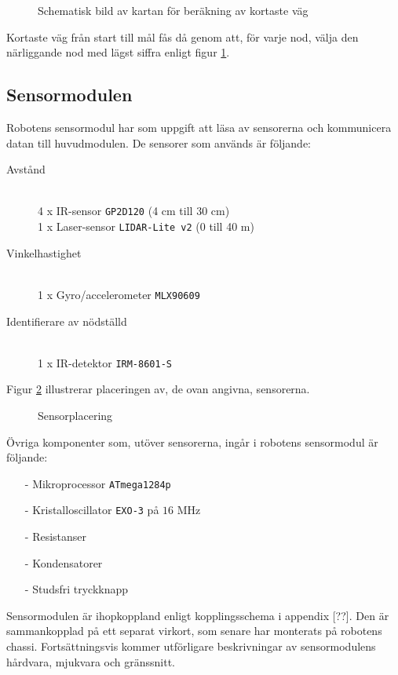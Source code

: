 \documentclass[11pt]{article}
\begin{document}
\begin{flushleft}
\begin{figure}[htbp]
\centering
\noindent\resizebox{0.7\linewidth}{!}{
	}
	\caption{Schematisk bild av kartan för beräkning av kortaste väg}	\label{path}
\end{figure}


Kortaste väg från start till mål fås då genom att, för varje nod, välja den närliggande nod med lägst siffra enligt figur \ref{path}.

\pagebreak

\subsection{Sensormodulen}
Robotens sensormodul har som uppgift att läsa av sensorerna och kommunicera datan till huvudmodulen. De sensorer som används är följande:
\begin{description}
	\item[Avstånd] \hfill \\
	4 x IR-sensor \verb+GP2D120+ (4 cm till 30 cm) \\
	1 x Laser-sensor \verb+LIDAR-Lite v2+ (0 till 40 m) \\
	\item[Vinkelhastighet] \hfill \\
	1 x Gyro/accelerometer \verb+MLX90609+ 
	\item[Identifierare av nödställd] \hfill \\
	1 x IR-detektor \verb+IRM-8601-S+
\end{description}
Figur \ref{sensors} illustrerar placeringen av, de ovan angivna, sensorerna. 

\begin{figure}[htbp]
\centering
\noindent\resizebox{.8\textwidth}{!}{
		}
	\caption{Sensorplacering \label{sensors}}
\end{figure}

Övriga komponenter som, utöver sensorerna, ingår i robotens sensormodul är följande:
\begin{itemize}
  \item[-] Mikroprocessor \verb+ATmega1284p+
  \item[-] Kristalloscillator \verb+EXO-3+ på $16$ MHz
  \item[-] Resistanser
  \item[-] Kondensatorer
  \item[-] Studsfri tryckknapp
\end{itemize}

Sensormodulen är ihopkoppland enligt kopplingsschema i appendix [??]. Den är sammankopplad på ett separat virkort, som senare har monterats på robotens chassi. Fortsättningsvis kommer utförligare beskrivningar av sensormodulens hårdvara, mjukvara och gränssnitt.



\end{flushleft}
\end{document}
